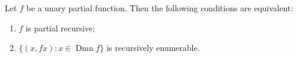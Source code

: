 Let $f$ be a unary partial function. Then the following conditions are equivalent:

\begin{enumerate}
\item[(i)] $f$ is partial recursive;
\item[(ii)] $\{(x, fx) : x \in \operatorname{Dmn} f\}$ is recursively enumerable.
\end{enumerate}
